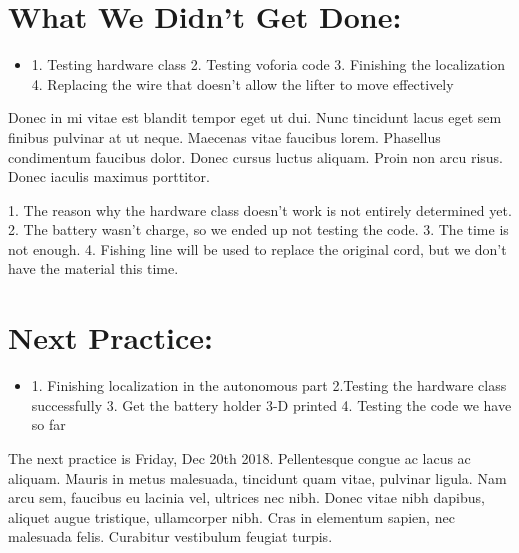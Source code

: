 \documentclass[12pt]{article}
\begin{document}
\section{What We Didn't Get Done:} %
\begin{itemize}
	\item 1. Testing hardware class 
	         2. Testing voforia code
	         3. Finishing the localization
		 4. Replacing the wire that doesn't allow the lifter to move effectively
\end{itemize}

Donec in mi vitae est blandit tempor eget ut dui. Nunc tincidunt lacus eget sem finibus pulvinar at ut neque. Maecenas vitae faucibus lorem. Phasellus condimentum faucibus dolor. Donec cursus luctus aliquam. Proin non arcu risus. Donec iaculis maximus porttitor.

1. The reason why the hardware class doesn't work is not entirely determined yet.
2. The battery wasn't charge, so we ended up not testing the code.
3. The time is not enough. 
4. Fishing line will be used to replace the original cord, but we don't have the material this time.

\section{Next Practice:}
\begin{itemize}
	\item 1. Finishing localization in the autonomous part
	          2.Testing the hardware class successfully 
	          3. Get the battery holder 3-D printed
	          4. Testing the code we have so far
\end{itemize}

The next practice is Friday, Dec 20th 2018. %
Pellentesque congue ac lacus ac aliquam. Mauris in metus malesuada, tincidunt quam vitae, pulvinar ligula. Nam arcu sem, faucibus eu lacinia vel, ultrices nec nibh. Donec vitae nibh dapibus, aliquet augue tristique, ullamcorper nibh. Cras in elementum sapien, nec malesuada felis. Curabitur vestibulum feugiat turpis. 
\end{document}
